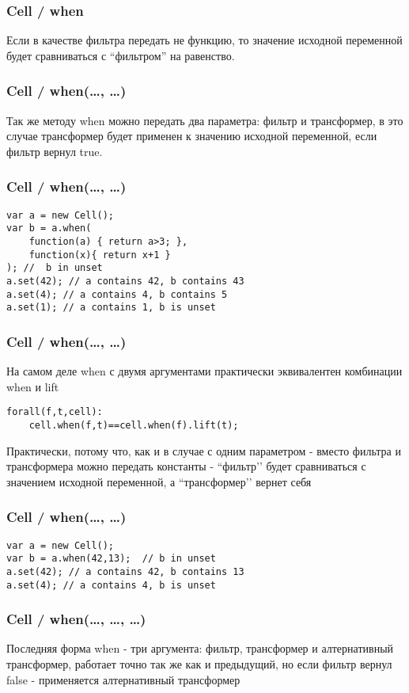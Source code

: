 \documentclass[xetex]{beamer}
\begin{document}
\begin{frame}[fragile]
\frametitle{Cell / when}
Если в качестве фильтра передать не функцию, то значение исходной переменной будет сравниваться с ``фильтром'' на равенство.
\end{frame}


\begin{frame}[fragile]
\frametitle{Cell / when(\dots, \dots)}
Так же методу when можно передать два параметра: фильтр и трансформер, в это случае трансформер будет применен к значению исходной переменной, если фильтр вернул true.
\end{frame}


\begin{frame}[fragile]
\frametitle{Cell / when(\dots, \dots)}
\begin{lstlisting}
var a = new Cell();
var b = a.when(
    function(a) { return a>3; }, 
    function(x){ return x+1 }
); //  b in unset
a.set(42); // a contains 42, b contains 43
a.set(4); // a contains 4, b contains 5
a.set(1); // a contains 1, b is unset
\end{lstlisting}
\end{frame}


\begin{frame}[fragile]
\frametitle{Cell / when(\dots, \dots)}
На самом деле when с двумя аргументами практически эквивалентен комбинации when и lift

\vspace{4mm}
\begin{lstlisting}
forall(f,t,cell):
    cell.when(f,t)==cell.when(f).lift(t);
\end{lstlisting}
\vspace{4mm}
Практически, потому что, как и в случае с одним параметром - вместо фильтра и трансформера можно передать константы - ``фильтр’’ будет сравниваться с значением исходной переменной, а ``трансформер’’ вернет себя
\end{frame}


\begin{frame}[fragile]
\frametitle{Cell / when(\dots, \dots)}
\begin{lstlisting}
var a = new Cell();
var b = a.when(42,13);  // b in unset
a.set(42); // a contains 42, b contains 13
a.set(4); // a contains 4, b is unset
\end{lstlisting}
\end{frame}


\begin{frame}[fragile]
\frametitle{Cell / when(\dots, \dots, \dots)}
Последняя форма when - три аргумента: фильтр, трансформер и алтернативный трансформер, работает точно так же как и предыдущий, но если фильтр вернул false - применяется алтернативный трансформер
\end{frame}
\end{document}
